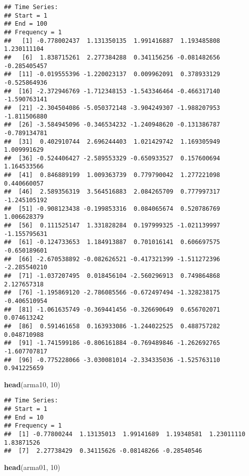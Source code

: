 \documentclass[
]{article}
\newenvironment{Shaded}{\begin{snugshade}}{\end{snugshade}}
\newcommand{\DecValTok}[1]{\textcolor[rgb]{0.00,0.00,0.81}{#1}}
\newcommand{\KeywordTok}[1]{\textcolor[rgb]{0.13,0.29,0.53}{\textbf{#1}}}
\newcommand{\NormalTok}[1]{#1}
\begin{document}
\begin{verbatim}
## Time Series:
## Start = 1 
## End = 100 
## Frequency = 1 
##   [1] -0.778002437  1.131350135  1.991416887  1.193485808  1.230111104
##   [6]  1.838715261  2.277384288  0.341156256 -0.081482656 -0.285405457
##  [11] -0.019555396 -1.220023137  0.009962091  0.378933129 -0.525864936
##  [16] -2.372946769 -1.712348153 -1.543346464 -0.466317140 -1.590763141
##  [21] -2.304504086 -5.050372148 -3.904249307 -1.988207953 -1.811506880
##  [26] -3.584945096 -0.346534232 -1.240948620 -0.131386787 -0.789134781
##  [31]  0.402910744  2.696244403  1.021429742  1.169305949  1.009991629
##  [36] -0.524406427 -2.589553329 -0.650933527  0.157600694  1.164533566
##  [41]  0.846889199  1.009363739  0.779790042  1.277221098  0.440660057
##  [46]  2.589356319  3.564516883  2.084265709  0.777997317 -1.245105192
##  [51] -0.908123438 -0.199853316  0.084065674  0.520786769  1.006628379
##  [56]  0.111525147  1.331828284  0.197999325 -1.021139997 -1.155795631
##  [61] -0.124733653  1.184913887  0.701016141  0.606697575 -0.650189601
##  [66] -2.670538892 -0.082626521 -0.417321399 -1.511272396 -2.285540210
##  [71] -1.037207495  0.018456104 -2.560296913  0.749864868  2.127657318
##  [76] -1.195869120 -2.786085566 -0.672497494 -1.328238175 -0.406510954
##  [81] -1.061635749 -0.369441456 -0.326690649  0.656702071  0.074613242
##  [86]  0.591461658  0.163933086 -1.244022525  0.488757282  0.048710988
##  [91] -1.741599186 -0.806161884 -0.769489846 -1.262692765 -1.607707817
##  [96] -0.775228066 -3.030081014 -2.334335036 -1.525763110  0.941225659
\end{verbatim}

\begin{Shaded}
\begin{Highlighting}[]
\KeywordTok{head}\NormalTok{(arma10, }\DecValTok{10}\NormalTok{)}
\end{Highlighting}
\end{Shaded}

\begin{verbatim}
## Time Series:
## Start = 1 
## End = 10 
## Frequency = 1 
##  [1] -0.77800244  1.13135013  1.99141689  1.19348581  1.23011110  1.83871526
##  [7]  2.27738429  0.34115626 -0.08148266 -0.28540546
\end{verbatim}

\begin{Shaded}
\begin{Highlighting}[]
\KeywordTok{head}\NormalTok{(arma01, }\DecValTok{10}\NormalTok{)}
\end{Highlighting}
\end{Shaded}
\end{document}
